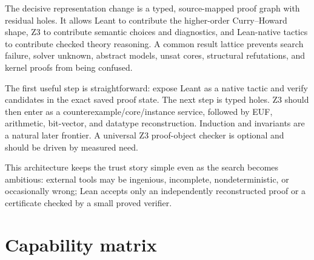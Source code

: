 \documentclass[11pt,letterpaper,openany]{report}
\newcommand{\code}[1]{\texttt{\detokenize{#1}}}
\begin{document}
The decisive representation change is a typed, source-mapped proof graph with residual
holes. It allows Leant to contribute the higher-order Curry--Howard shape, Z3 to
contribute semantic choices and diagnostics, and Lean-native tactics to contribute
checked theory reasoning. A common result lattice prevents search failure, solver
unknown, abstract models, unsat cores, structural refutations, and kernel proofs from
being confused.

The first useful step is straightforward: expose Leant as a native \code{leant?}
tactic and verify candidates in the exact saved proof state. The next step is typed
holes. Z3 should then enter as a counterexample/core/instance service, followed by
EUF, arithmetic, bit-vector, and datatype reconstruction. Induction and invariants are
a natural later frontier. A universal Z3 proof-object checker is optional and should
be driven by measured need.

This architecture keeps the trust story simple even as the search becomes ambitious:
external tools may be ingenious, incomplete, nondeterministic, or occasionally wrong;
Lean accepts only an independently reconstructed proof or a certificate checked by a
small proved verifier.

\appendix

\chapter{Capability matrix}
\label{app:matrix}
\end{document}
